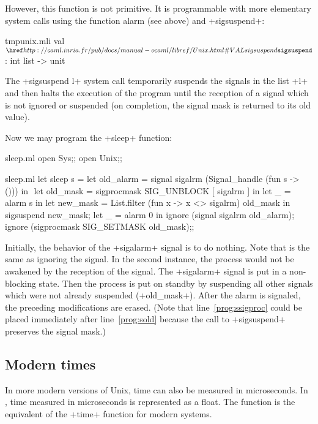 However, this function is not primitive. It is programmable with 
more elementary system calls using the function alarm (see 
above) and \ml+sigsuspend+: 

%
\begin{listingcodefile}{tmpunix.mli}
val $\libvalue{Unix}{sigsuspend}$ : int list -> unit
\end{listingcodefile}
%

The \ml+sigsuspend l+ system call temporarily suspends the signals in the 
list \ml+l+ and then halts the execution of the program until the reception 
of a signal which is not ignored or suspended (on completion, the 
signal mask is returned to its old value).

\begin{example} Now we may program the \ml+sleep+ function:
%
\begin{codefile}{sleep.ml}
open Sys;;
open Unix;;
\end{codefile}
%
\begin{listingcodefile}[style=numbers]{sleep.ml}
let sleep s = 
  let old_alarm = signal sigalrm (Signal_handle (fun s -> ())) in $\label{prog:sold}$
  let old_mask = sigprocmask SIG_UNBLOCK [ sigalrm ] in
  let _ = alarm s in
  let new_mask = List.filter (fun x -> x <> sigalrm) old_mask in
  sigsuspend new_mask; 
  let _ = alarm 0 in
  ignore (signal sigalrm old_alarm); 
  ignore (sigprocmask SIG_SETMASK old_mask)$\label{prog:ssigproc}$;;
\end{listingcodefile}
%

Initially, the behavior of the \ml+sigalarm+ signal is to do nothing.  Note
that  is the same as ignoring the signal.  In
the second instance, the process would not be awakened by the reception
of the signal. The \ml+sigalarm+ signal is put in a non-blocking
state.  Then the process is put on standby by suspending all other
signals which were not already suspended (\ml+old_mask+). After the alarm
is signaled, the preceding modifications are erased. (Note that
line~\ref{prog:ssigproc} could be placed immediately after
line~\ref{prog:sold} because the call to \ml+sigsuspend+ preserves
the signal mask.)

\end{example}

\subsection*{Modern times}

In more modern versions of Unix, time can also be measured in microseconds.
In {\ocaml}, time measured in microseconds is represented as a float.  
The  function is the equivalent of the \ml+time+ 
function for modern systems.

